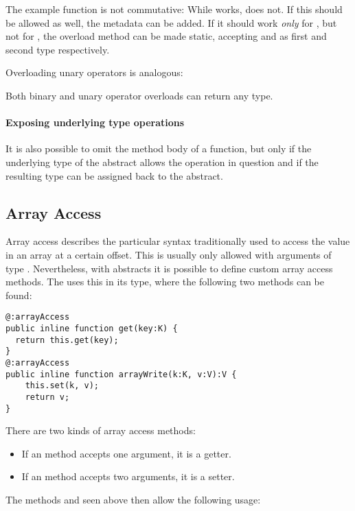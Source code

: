 The example  function is not commutative: While  works,  does not. If this should be allowed as well, the  metadata can be added. If it should work \emph{only} for , but not for , the overload method can be made static, accepting  and  as first and second type respectively.

Overloading unary operators is analogous:

Both binary and unary operator overloads can return any type.

\paragraph{Exposing underlying type operations}

It is also possible to omit the method body of a  function, but only if the underlying type of the abstract allows the operation in question and if the resulting type can be assigned back to the abstract.




\subsection{Array Access}
\label{types-abstract-array-access}

Array access describes the particular syntax traditionally used to access the value in an array at a certain offset. This is usually only allowed with arguments of type . Nevertheless, with abstracts it is possible to define custom array access methods. The  uses this in its  type, where the following two methods can be found:

\begin{lstlisting}
@:arrayAccess
public inline function get(key:K) {
  return this.get(key);
}
@:arrayAccess
public inline function arrayWrite(k:K, v:V):V {
	this.set(k, v);
	return v;
}
\end{lstlisting}
There are two kinds of array access methods:

\begin{itemize}
	\item If an  method accepts one argument, it is a getter.
	\item If an  method accepts two arguments, it is a setter.
\end{itemize}
The methods  and  seen above then allow the following usage:

